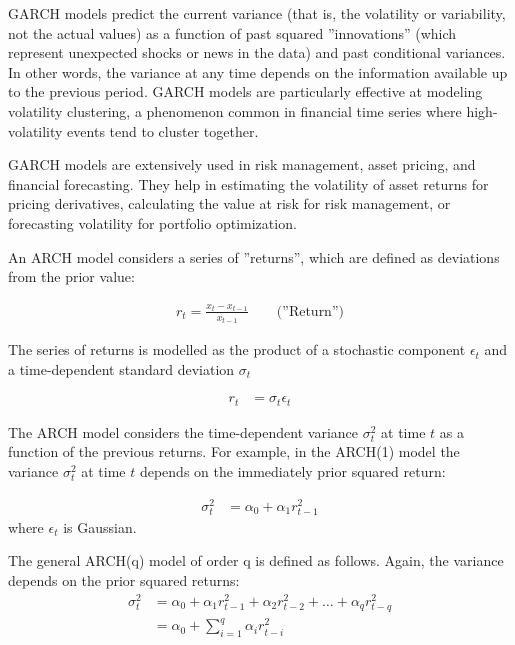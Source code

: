 GARCH models predict the current variance (that is, the volatility or variability, not the actual values) as a function of past squared ''innovations'' (which represent unexpected shocks or news in the data) and past conditional variances. In other words, the variance at any time depends on the information available up to the previous period. GARCH models are particularly effective at modeling volatility clustering, a phenomenon common in financial time series where high-volatility events tend to cluster together.

GARCH models are extensively used in risk management, asset pricing, and financial forecasting. They help in estimating the volatility of asset returns for pricing derivatives, calculating the value at risk for risk management, or forecasting volatility for portfolio optimization. 

An ARCH model considers a series of ''returns'', which are defined as deviations from the prior value:

\begin{align*}
r_t = \frac{x_t - x_{t-1}}{x_{t-1}} \qquad \text{(''Return'')}
\end{align*}

The series of returns is modelled as the product of a stochastic component $\epsilon_t$ and a time-dependent standard deviation $\sigma_t$

\begin{align*}
r_t &= \sigma_t \epsilon_t
\end{align*}

The ARCH model considers the time-dependent variance $\sigma_t^2$ at time $t$ as a function of the previous returns. For example, in the ARCH(1) model the variance $\sigma_t^2$ at time $t$ depends on the immediately prior squared return:

\begin{align*}
\sigma_t^2 &= \alpha_0 + \alpha_1 r_{t-1}^2
\end{align*}
\noindent where $\epsilon_t$ is Gaussian.

\begin{samepage}
The general ARCH(q) model of order q is defined as follows. Again, the variance depends on the prior squared returns:
\begin{align*}
\sigma_t^2 &= \alpha_0 + \alpha_1 r_{t-1}^2 + \alpha_2 r_{t-2}^2 + \ldots + \alpha_q r_{t-q}^2 \\
           &= \alpha_0 + \sum_{i=1}^q \alpha_i r_{t-i}^2
\end{align*}
\end{samepage}

